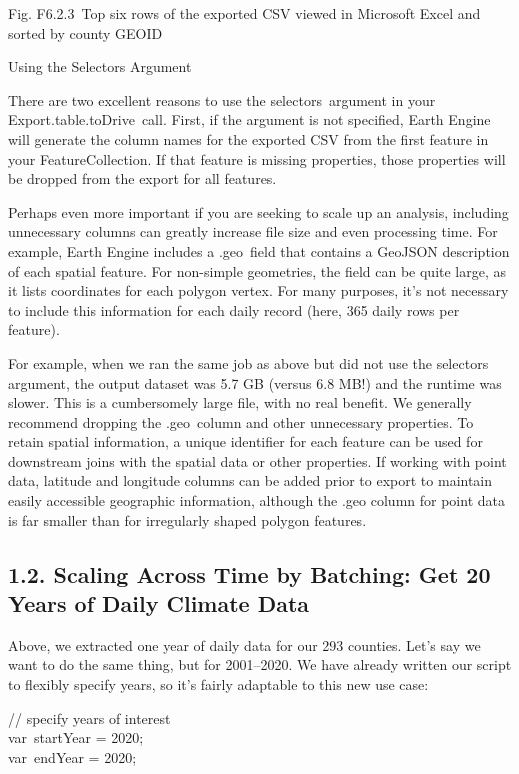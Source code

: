 \documentclass[
  letterpaper,
  DIV=11,
  numbers=noendperiod]{scrreprt}
\begin{document}
Fig. F6.2.3~Top six rows of the exported CSV viewed in Microsoft Excel
and sorted by county GEOID~

Using the Selectors Argument

There are two excellent reasons to use the selectors~argument in your
Export.table.toDrive~call. First, if the argument is not specified,
Earth Engine will generate the column names for the exported CSV from
the first feature in your FeatureCollection. If that feature is missing
properties, those properties will be dropped from the export for all
features.

Perhaps even more important if you are seeking to scale up an analysis,
including unnecessary columns can greatly increase file size and even
processing time. For example, Earth Engine includes a .geo~field that
contains a GeoJSON description of each spatial feature. For non-simple
geometries, the field can be quite large, as it lists coordinates for
each polygon vertex. For many purposes, it's not necessary to include
this information for each daily record (here, 365 daily rows per
feature).

For example, when we ran the same job as above but did not use the
selectors argument, the output dataset was 5.7 GB (versus 6.8 MB!) and
the runtime was slower. This is a cumbersomely large file, with no real
benefit. We generally recommend dropping the .geo~column and other
unnecessary properties. To retain spatial information, a unique
identifier for each feature can be used for downstream joins with the
spatial data or other properties. If working with point data, latitude
and longitude columns can be added prior to export to maintain easily
accessible geographic information, although the .geo column for point
data is far smaller than for irregularly shaped polygon features.

\hypertarget{scaling-across-time-by-batching-get-20-years-of-daily-climate-data}{%
\subsection{1.2. Scaling Across Time by Batching: Get 20 Years of Daily
Climate
Data}\label{scaling-across-time-by-batching-get-20-years-of-daily-climate-data}}

Above, we extracted one year of daily data for our 293 counties. Let's
say we want to do the same thing, but for 2001--2020. We have already
written our script to flexibly specify years, so it's fairly adaptable
to this new use case:

// specify years of interest\\
var~startYear = 2020;\\
var~endYear = 2020;
\end{document}

